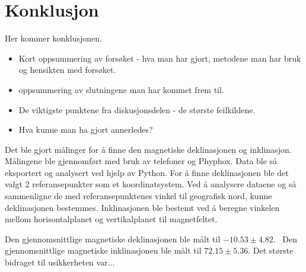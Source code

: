 \section{Konklusjon}
Her kommer konklusjonen.

\begin{itemize}
    \item Kort oppsummering av forsøket - hva man har gjort, metodene man har bruk og hensikten med forsøket. 
    \item oppsummering av slutningene man har kommet frem til.
    \item De viktigste punktene fra diskusjonsdelen - de største feilkildene. 
    \item Hva kunne man ha gjort annerledes?
\end{itemize}

Det ble gjort målinger for å finne den magnetiske deklinasjonen og inklinasjon. Målingene ble gjennomført med bruk av telefoner og Phyphox. Data ble så eksportert og analysert ved hjelp av Python. For å finne deklinasjonen ble det valgt 2 referansepunkter som et koordinatsystem. Ved å analysere dataene og så sammenligne de med referansepunktenes vinkel til geografisk nord, kunne deklinasjonen bestemmes. Inklinasjonen ble bestemt ved å beregne vinkelen mellom horisontalplanet og vertikalplanet til magnetfeltet. 

Den gjennomsnittlige magnetiske deklinasjonen ble målt til $-10.53 \pm 4.82$\textdegree. \ Den gjennomsnittlige magnetiske inklinasjonen ble målt til $72.15\pm5.36$\textdegree. Det største bidraget til usikkerheten var...
